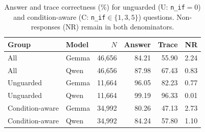 \begin{table}[t]
\centering
\caption{Answer and trace correctness (\%) for unguarded (U: \mbox{\texttt{n\_if}$=0$}) and condition-aware (C: \mbox{\texttt{n\_if}}$\in\{1,3,5\}$) questions. Non-responses (NR) remain in both denominators.}
\label{tab:overall}
\scriptsize
\setlength{\tabcolsep}{3pt}
\begin{tabular}{llrrrr}
\toprule
Group & Model & $N$ & Answer & Trace & NR \\
\midrule
All & Gemma & 46,656 & 84.21 & 55.90 & 2.24 \\
All & Qwen & 46,656 & 87.98 & 67.43 & 0.83 \\
\midrule
Unguarded & Gemma & 11,664 & 96.05 & 82.23 & 0.77 \\
Unguarded & Qwen & 11,664 & 99.19 & 96.33 & 0.01 \\
\midrule
Condition-aware & Gemma & 34,992 & 80.26 & 47.13 & 2.73 \\
Condition-aware & Qwen & 34,992 & 84.24 & 57.80 & 1.10 \\
\bottomrule
\end{tabular}

\end{table}
